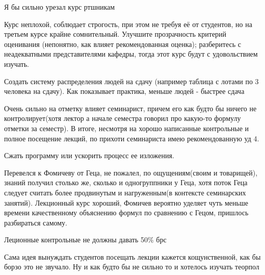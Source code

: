         \begin{commentbox}
            Я бы сильно урезал курс ртшникам
        \end{commentbox}

        \begin{commentbox}
            Курс неплохой, соблюдает строгость, при этом не требуя её от студентов, но на третьем курсе крайне сомнительный. Улучшите прозрачность критерий оценивания (непонятно, как влияет рекомендованная оценка); разберитесь с неадекватными представителями кафедры, тогда этот курс будут с удовольствием изучать.
        \end{commentbox}

        \begin{commentbox}
            Создать систему распределения людей на сдачу (например таблица с лотами по 3 человека на сдачу). Как показывает практика, меньше людей - быстрее сдача
        \end{commentbox}

        \begin{commentbox}
            Очень сильно на отметку влияет семинарист, причем его как будто бы ничего не контролирует(хотя лектор а начале семестра говорил про какую-то формулу отметки за семестр). В итоге, несмотря на хорошо написанные контрольные и полное посещение лекций, по прихоти семинариста имею рекомендованную уд 4.
        \end{commentbox}

        \begin{commentbox}
            Сжать программу или ускорить процесс ее изложения.
        \end{commentbox}

        \begin{commentbox}
            Перевелся к Фомичеву от Геца, не пожалел, по ощущениям(своим и товарищей), знаний получил столько же, сколько и одногруппники у Геца, хотя поток Геца следует считать более продвинутым и нагруженным(в контексте семинарских занятий). Лекционный курс хороший, Фомичев вероятно уделяет чуть меньше времени качественному объяснению формул по сравнению с Гецом, пришлось разбираться самому.
        \end{commentbox}

        \begin{commentbox}
            Леционные контрольные не должны давать 50\% брс
        \end{commentbox}

        \begin{commentbox}
            Сама идея вынуждать студентов посещать лекции кажется кощунственной, как бы борзо это не звучало.
            Ну и как будто бы не сильно то и хотелось изучать теорпол
        \end{commentbox}

